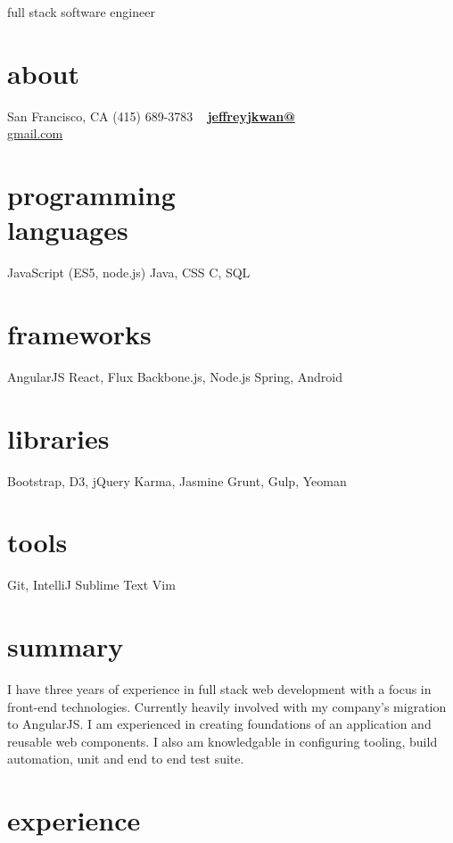 \documentclass[print]{friggeri-cv}
\begin{document}
       {full stack software engineer}


\begin{aside}
  \section{about}
    San Francisco, CA
    (415) 689-3783
    ~
    \href{mailto:jeffreyjkwan@gmail.com}{\textbf{jeffreyjkwan@}\\gmail.com}
  \section{programming\\languages}
    JavaScript
    (ES5, node.js)
    Java, CSS
    C, SQL
  \section{frameworks}
    AngularJS
    React, Flux
    Backbone.js, Node.js
    Spring, Android
  \section{libraries}
    Bootstrap, D3, jQuery
    Karma, Jasmine
    Grunt, Gulp, Yeoman
  \section{tools}
    Git, IntelliJ
    Sublime Text
    Vim
\end{aside}

\section{summary}

I have three years of experience in full stack web development with a focus in front-end technologies. Currently heavily involved with my company's migration to AngularJS. I am experienced in creating foundations of an application and reusable web components. I also am knowledgable in configuring tooling, build automation, unit and end to end test suite.

\section{experience}
\end{document}
